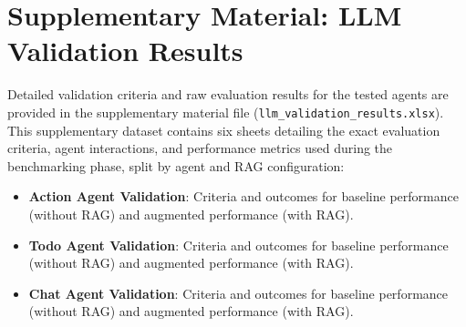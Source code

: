 \documentclass[conference]{IEEEtran}
\begin{document}
\appendices
\section{Supplementary Material: LLM Validation Results}
\label{app:validation_results}
Detailed validation criteria and raw evaluation results for the tested agents are provided in the supplementary material file (\texttt{llm\_validation\_results.xlsx}). This supplementary dataset contains six sheets detailing the exact evaluation criteria, agent interactions, and performance metrics used during the benchmarking phase, split by agent and RAG configuration:
\begin{itemize}
    \item \textbf{Action Agent Validation}: Criteria and outcomes for baseline performance (without RAG) and augmented performance (with RAG).
    \item \textbf{Todo Agent Validation}: Criteria and outcomes for baseline performance (without RAG) and augmented performance (with RAG).
    \item \textbf{Chat Agent Validation}: Criteria and outcomes for baseline performance (without RAG) and augmented performance (with RAG).
\end{itemize}


 
\end{document}
